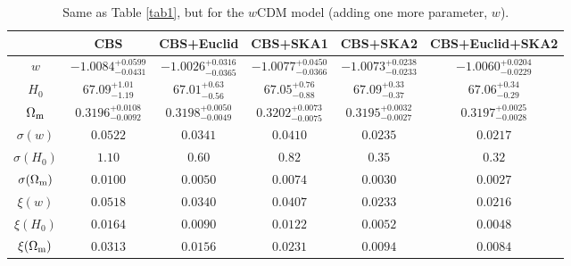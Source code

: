 \documentclass[aps,prd,amsmath,amssymb,showpacs,floats,floatfix,nofootinbib,reprint]{revtex4-1}
\begin{document}
\begin{table}
\renewcommand{\arraystretch}{1.5}
\caption{\label{tab2}Same as  Table \ref{tab1}, but for the $w$CDM model (adding one more parameter, $w$). 
}
\begin{tabular}{|c|c c c c c|}
\hline
&CBS&CBS+Euclid&CBS+SKA1&CBS+SKA2&CBS+Euclid+SKA2\\
\hline
$w$&$-1.0084^{+0.0599}_{-0.0431}$&$-1.0026^{+0.0316}_{-0.0365}$&$-1.0077^{+0.0450}_{-0.0366}$&$-1.0073^{+0.0238}_{-0.0233}$&$-1.0060^{+0.0204}_{-0.0229}$\\
  $H_0$&$67.09^{+1.01}_{-1.19}$&$67.01^{+0.63}_{-0.56}$&$67.05^{+0.76}_{-0.88}$&$67.09^{+0.33}_{-0.37}$&$67.06^{+0.34}_{-0.29}$\\
 $\Omega_{\rm m}$&$0.3196^{+0.0108}_{-0.0092}$&$0.3198^{+0.0050}_{-0.0049}$&$0.3202^{+0.0073}_{-0.0075}$&$0.3195^{+0.0032}_{-0.0027}$&$0.3197^{+0.0025}_{-0.0028}$\\

\hline
  $\sigma(w)$&$0.0522$&$0.0341$&$0.0410$&$0.0235$&$0.0217$\\
  $\sigma(H_0)$&$1.10$&$0.60$&$0.82$&$0.35$&$0.32$\\
 $\sigma(\Omega_{\rm m})$&$0.0100$&$0.0050$&$0.0074$&$0.0030$&$0.0027$\\
 \hline
$\xi(w)$&$0.0518$&$0.0340$&$0.0407$&$0.0233$&$0.0216$\\
$\xi(H_0)$&$0.0164$&$0.0090$&$0.0122$&$0.0052$&$0.0048$\\
 $\xi(\Omega_{\rm m})$&$0.0313$&$0.0156$&$0.0231$&$0.0094$&$0.0084$\\
\hline
\end{tabular}
\end{table}
\end{document}

